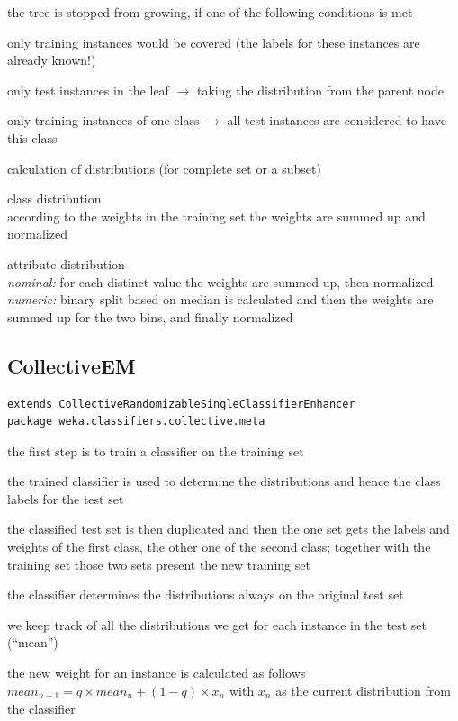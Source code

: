 \documentclass[a4paper]{book}
\begin{document}
\begin{tight_itemize}
	\item the tree is stopped from growing, if one of the following 
	conditions is met
	\begin{tight_enumerate}
		\item only training instances would be covered (the labels for these 
		instances are already known!)
		\item only test instances in the leaf $\rightarrow$ taking the 
		distribution from the parent node
		\item only training instances of one class $\rightarrow$ all test 
		instances are considered to have this class
	\end{tight_enumerate}
	
	\item calculation of distributions (for complete set or a subset)
	\begin{tight_enumerate}
		\item class distribution \\
		according to the weights in the training set the weights are summed up 
		and normalized
		\item attribute distribution \\
		\textit{nominal:} for each distinct value the weights are summed up, then normalized \\
		\textit{numeric:} binary split based on median is calculated and then the weights are 
		summed up for the two bins, and finally normalized
	\end{tight_enumerate}
\end{tight_itemize}

\subsection{CollectiveEM}
\begin{verbatim}
extends CollectiveRandomizableSingleClassifierEnhancer
package weka.classifiers.collective.meta
\end{verbatim}

\begin{tight_itemize}
	\item the first step is to train a classifier on the training set
	\item the trained classifier is used to determine the distributions and 
	hence the class labels for the test set
	\item the classified test set is then duplicated and then the one set gets 
	the labels and weights of the first class, the other one of the second class; 
	together with the training set those two sets present the new training set
	\item the classifier determines the distributions always on the original test set
	\item we keep track of all the distributions we get for each instance in the 
	test set (``mean'')
	\item the new weight for an instance is calculated as follows \\
	$mean_{n+1} = q \times mean_n + (1- q) \times x_{n}$
	with $x_{n}$ as the current distribution from the classifier
\end{tight_itemize}
\end{document}
